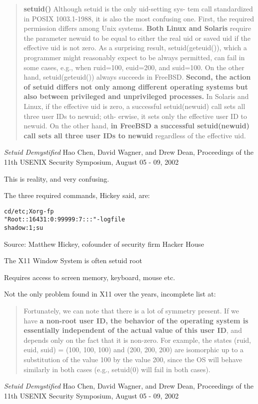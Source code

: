 \documentclass[Screen16to9,17pt]{foils}
\begin{document}
\begin{quote}
{\bf setuid()} Although setuid is the only uid-setting sys-
tem call standardized in POSIX 1003.1-1988, it is also
the most confusing one. First, the required permission
differs among Unix systems. {\bf Both Linux and Solaris}
require the parameter newuid to be equal to either the
real uid or saved uid if the effective uid is not zero. As
a surprising result, setuid(geteuid()), which a programmer might reasonably expect to be always permitted, can fail in some cases, e.g., when ruid=100, euid=200, and
suid=100. On the other hand, setuid(geteuid()) always
succeeds in FreeBSD. {\bf Second, the action of setuid differs not only among different operating systems but also
between privileged and unprivileged processes.} In Solaris and Linux, if the effective uid is zero, a successful
setuid(newuid) call sets all three user IDs to newuid; oth-
erwise, it sets only the effective user ID to newuid. On
the other hand, {\bf in FreeBSD a successful setuid(newuid)
call sets all three user IDs to newuid} regardless of the
effective uid.
\end{quote}
\emph{Setuid Demystified} Hao Chen, David Wagner, and Drew Dean,
Proceedings of the 11th USENIX Security Symposium,
August 05 - 09, 2002

This is reality, and very confusing.


The three required commands, Hickey said, are:
\begin{alltt}
cd /etc; Xorg -fp
"Root::16431:0:99999:7:::" -logfile
shadow  :1;su
\end{alltt}
Source: Matthew Hickey, cofounder of security firm Hacker House

\begin{list2}
\item The X11 Window System is often setuid root
\item Requires access to screen memory, keyboard, mouse etc.
\item Not the only problem found in X11 over the years, incomplete list at:\\
\end{list2}


\begin{quote}
Fortunately, we can note that there is a lot of symmetry present. If we have {\bf a non-root user ID, the behavior of the operating system is essentially independent
of the actual value of this user ID}, and depends only
on the fact that it is non-zero. For example, the states
(ruid, euid, suid) = (100, 100, 100) and (200, 200, 200)
are isomorphic up to a substitution of the value 100 by
the value 200, since the OS will behave similarly in both
cases (e.g., setuid(0) will fail in both cases).
\end{quote}
\emph{Setuid Demystified} Hao Chen, David Wagner, and Drew Dean,
Proceedings of the 11th USENIX Security Symposium,
August 05 - 09, 2002
\end{document}
